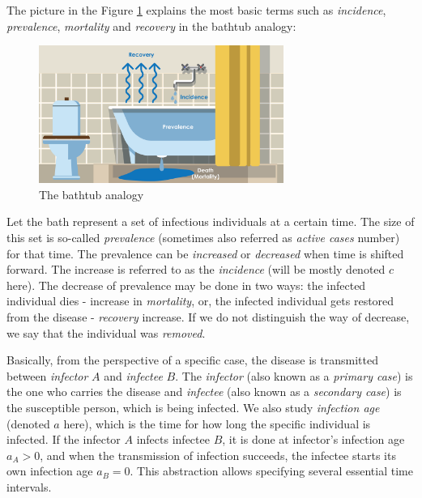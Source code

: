 \documentclass[
  digital, %
  oneside, %
  lof,     %
  lot,     %
]{fithesis4}
\begin{document}
The picture in the Figure \ref{fig:epidemiologists-bathtub} explains the most basic terms such as \textit{incidence}, \textit{prevalence}, \textit{mortality} and \textit{recovery} in the bathtub analogy:

\begin{figure}[h]
  \begin{center}
    \includegraphics[width=8cm]{static/images/epidemiologists-bathtub.png}
  \end{center}
  \caption{The bathtub analogy \cite{steward2020}}
  \label{fig:epidemiologists-bathtub}
\end{figure}

Let the bath represent a set of infectious individuals at a certain time.
The size of this set is so-called \textit{prevalence} (sometimes also referred as \textit{active cases} number) for that time.
The prevalence can be \textit{increased} or \textit{decreased} when time is shifted forward.
The increase is referred to as the \textit{incidence} (will be mostly denoted $c$ here).
The decrease of prevalence may be done in two ways:
the infected individual dies - increase in \textit{mortality}, or, the infected individual gets restored from the disease - \textit{recovery} increase.
If we do not distinguish the way of decrease, we say that the individual was \textit{removed}.

Basically, from the perspective of a specific case, the disease is transmitted between \textit{infector} $A$ and \textit{infectee} $B$.
The \textit{infector} (also known as a \textit{primary case}) is the one who carries the disease and \textit{infectee} (also known as a \textit{secondary case}) is the susceptible person, which is being infected.
We also study \textit{infection age} (denoted $a$ here), which is the time for how long the specific individual is infected.
If the infector $A$ infects infectee $B$, it is done at infector's infection age $a_A > 0$, and when the transmission of infection succeeds, the infectee starts its own infection age $a_B = 0$.
This abstraction allows specifying several essential time intervals.
\end{document}
